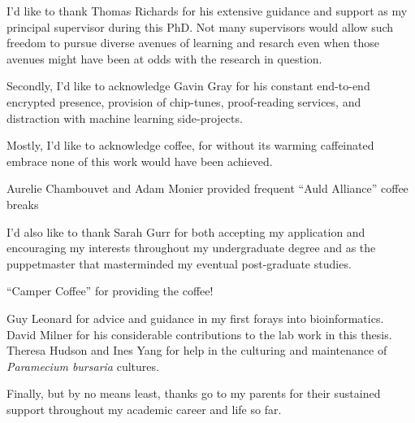 
I'd like to thank Thomas Richards for his extensive guidance and support 
as my principal supervisor during this PhD. Not many supervisors
would allow such freedom to pursue diverse avenues of learning and
resarch even when those avenues might have been at odds with the research 
in question.

Secondly, I'd like to acknowledge Gavin Gray 
for his constant end-to-end encrypted presence, provision of chip-tunes,
proof-reading services, and distraction with machine learning side-projects.  


Mostly, I'd like to acknowledge coffee, for without its warming caffeinated embrace
none of this work would have been achieved.  


Aurelie Chambouvet and Adam Monier provided frequent 
``Auld Alliance'' coffee breaks 


I'd also like to thank Sarah Gurr for both accepting my application and encouraging
my interests throughout my undergraduate degree and as the puppetmaster that 
masterminded my eventual post-graduate studies.






``Camper Coffee'' for providing the coffee! 


Guy Leonard for advice and guidance in my first forays into bioinformatics. 
David Milner for his considerable contributions to the lab work in this thesis.
Theresa Hudson and Ines Yang for help in the culturing and maintenance of 
\textit{Paramecium bursaria} cultures. 

Finally, but by no means least, thanks go to my parents for their sustained
support throughout my academic career and life so far.

